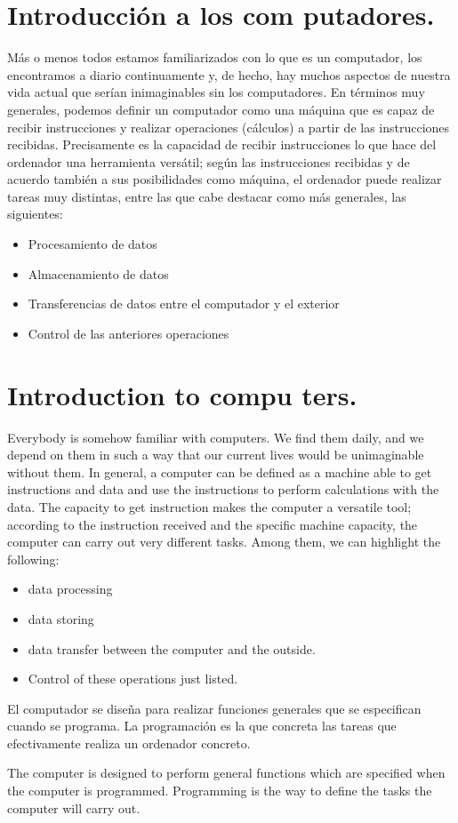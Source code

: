\begin{paracol}{2}
\section{Introducción a los com\- putadores.}
Más o menos todos estamos familiarizados con lo que es un computador, los encontramos a diario continuamente  y, de hecho, hay muchos aspectos de nuestra vida actual que serían inimaginables sin los computadores.  En términos muy generales, podemos definir un computador como una máquina que es capaz de recibir instrucciones y realizar operaciones (cálculos) a partir de las instrucciones recibidas. Precisamente es la capacidad de recibir instrucciones lo que hace del ordenador una herramienta versátil; según las instrucciones recibidas y de acuerdo también a sus posibilidades como máquina,  el ordenador puede realizar tareas muy distintas, entre las que cabe destacar como más generales, las siguientes:
\begin{itemize}
\item Procesamiento de datos 
\item Almacenamiento de datos
\item Transferencias de datos entre el computador y el exterior
\item Control de las anteriores operaciones
\end{itemize}

\switchcolumn
\section{Introduction to compu\- ters.}
Everybody is somehow familiar with computers. We find them daily, and we depend on them in such a way that our current lives would be unimaginable without them. In general, a computer can be defined as a machine able to get instructions and data and use the instructions to perform calculations with the data. The capacity to get instruction makes the computer a versatile tool; according to the instruction received and the specific machine capacity, the computer can carry out very different tasks. Among them, we can highlight the following:
\begin{itemize}
\item data processing
\item data storing
\item data transfer between the computer and the outside.
\item Control of these operations just listed.
\end{itemize}    

\switchcolumn
El computador se diseña para realizar funciones generales que se especifican cuando se programa. La programación es la que concreta las tareas que efectivamente realiza un ordenador concreto.

\switchcolumn
The computer is designed to perform general functions which are specified when the computer is programmed. Programming is the way to define the tasks the computer will carry out. 

\end{paracol}
 


